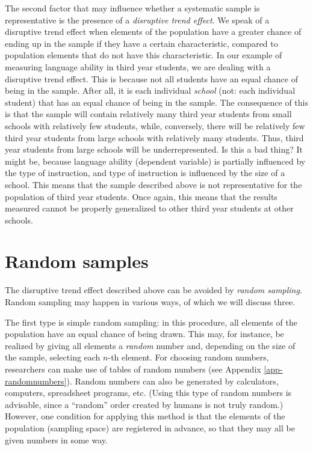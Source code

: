 \documentclass[
]{book}
\begin{document}
The second factor that may influence whether a systematic sample is representative is the presence of a \emph{disruptive trend effect}. We speak of a disruptive trend effect when elements of the population have a greater chance of ending up in the sample if they have a certain characteristic, compared to population elements that do not have this characteristic. In our example of measuring language ability in third year students, we are dealing with a disruptive trend effect. This is because not all students have an equal chance of being in the sample. After all, it is each individual \emph{school} (not: each individual student) that has an equal chance of being in the sample. The consequence of this is that the sample will contain relatively many third year students from small schools with relatively few students, while, conversely, there will be relatively few third year students from large schools with relatively many students. Thus, third year students from large schools will be underrepresented. Is this a bad thing? It might be, because language ability (dependent variable) is partially influenced by the type of instruction, and type of instruction is influenced by the size of a school. This means that the sample described above is not representative for the population of third year students. Once again, this means that the results measured cannot be properly generalized to other third year students at other schools.

\hypertarget{sec:random-samples}{%
\section{Random samples}\label{sec:random-samples}}

The disruptive trend effect described above can be avoided by \emph{random sampling}. Random sampling may happen in various ways, of which we will discuss three.

The first type is simple random sampling: in this procedure, all elements of the population have an equal chance of being drawn. This may, for instance, be realized by giving all elements a \emph{random} number and, depending on the size of the sample, selecting each \(n\)-th element. For choosing random numbers, researchers can make use of tables of random numbers (see Appendix \ref{app-randomnumbers}). Random numbers can also be generated by calculators, computers, spreadsheet programs, etc. (Using this type of random numbers is advisable, since a ``random'' order created by humans is not truly random.) However, one condition for applying this method is that the elements of the population (sampling space) are registered in advance, so that they may all be given numbers in some way.
\end{document}
